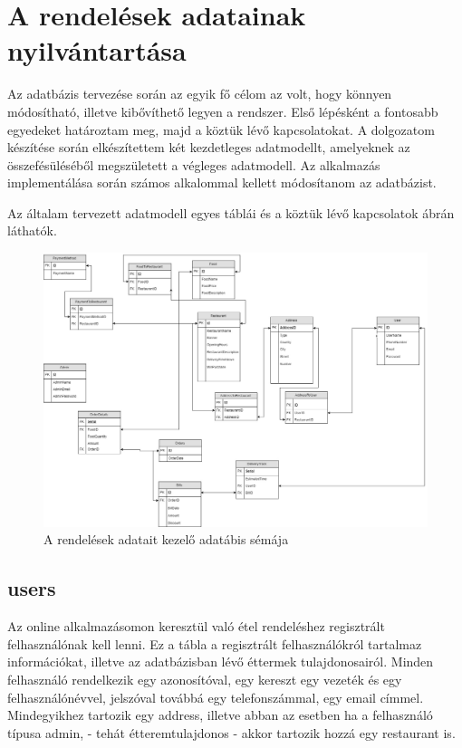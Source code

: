 \chapter{A rendelések adatainak nyilvántartása}

Az adatbázis tervezése során az egyik fő célom az volt, hogy könnyen módosítható, illetve kibővíthető legyen a rendszer. Első lépésként a fontosabb egyedeket határoztam meg, majd a köztük lévő kapcsolatokat. A dolgozatom készítése során elkészítettem két kezdetleges adatmodellt, amelyeknek az összefésüléséből megszületett a végleges adatmodell. Az alkalmazás implementálása során számos alkalommal kellett módosítanom az adatbázist.

Az általam tervezett adatmodell egyes táblái és a köztük lévő kapcsolatok  ábrán láthatók.

\begin{figure}
\includegraphics[scale=0.3]{kepek/rendeles_sema.jpg}
\caption{A rendelések adatait kezelő adatábis sémája}
\label{fig:rendeles_sema}
\end{figure}

\section{users}

Az online alkalmazásomon keresztül való étel rendeléshez regisztrált felhasználónak kell lenni. Ez a tábla a regisztrált felhasználókról tartalmaz információkat, illetve az adatbázisban lévő éttermek tulajdonosairól. Minden felhasználó rendelkezik egy azonosítóval, egy kereszt egy vezeték és egy felhasználónévvel, jelszóval továbbá egy telefonszámmal, egy email címmel. Mindegyikhez tartozik egy address, illetve abban az esetben ha a felhasználó típusa admin, - tehát étteremtulajdonos - akkor tartozik hozzá egy restaurant is.

